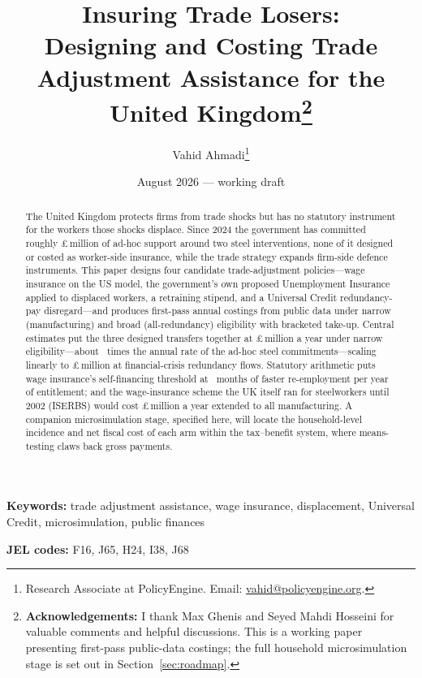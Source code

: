 \documentclass[11pt]{article}
\title{\bfseries Insuring Trade Losers:\\[0.15cm] Designing and Costing Trade Adjustment Assistance for the United Kingdom\thanks{\textbf{Acknowledgements:} I thank Max Ghenis and Seyed Mahdi Hosseini for valuable comments and helpful discussions. This is a working paper presenting first-pass public-data costings; the full household microsimulation stage is set out in Section~\ref{sec:roadmap}.}\\[0.7cm]}
\author{Vahid Ahmadi\thanks{Research Associate at PolicyEngine. Email: \href{mailto:vahid@policyengine.org}{vahid@policyengine.org}.}}
\date{\small August 2026 --- working draft}
\begin{document}
\maketitle

\begin{abstract}
\noindent The United Kingdom protects firms from trade shocks but has no
statutory instrument for the workers those shocks displace. Since 2024 the
government has committed roughly
\pounds\InstAdHocSteelTotal\,million of ad-hoc support around two steel
interventions, none of it designed or costed as worker-side insurance,
while the trade strategy expands firm-side defence instruments. This paper
designs four candidate trade-adjustment policies---wage insurance on the US
model, the government's own proposed Unemployment Insurance applied to
displaced workers, a retraining stipend, and a Universal Credit
redundancy-pay disregard---and produces first-pass annual costings from
public data under narrow (manufacturing) and broad (all-redundancy)
eligibility with bracketed take-up. Central estimates put the three designed transfers together at
\pounds\TaaTotalABCCentralNarrow\,million a year under narrow
eligibility---about \TaaABCMultipleSteelPerYear\ times the annual rate
of the ad-hoc steel commitments---scaling linearly to
\pounds\TaaCostPeakGFC\,million at financial-crisis redundancy flows.
Statutory arithmetic puts wage insurance's self-financing threshold at
\TaaBreakEvenMonths\ months of faster re-employment per year of
entitlement; and the wage-insurance scheme the UK itself ran for
steelworkers until 2002 (ISERBS) would cost
\pounds\TaaIserbsCost\,million a year extended to all manufacturing. A companion microsimulation stage, specified here, will
locate the household-level incidence and net fiscal cost of each arm within
the tax--benefit system, where means-testing claws back gross payments.
\end{abstract}

\medskip
\noindent\textbf{Keywords:} trade adjustment assistance, wage insurance, displacement, Universal Credit, microsimulation, public finances

\smallskip
\noindent\textbf{JEL codes:} F16, J65, H24, I38, J68

\newpage










\clearpage

\end{document}
